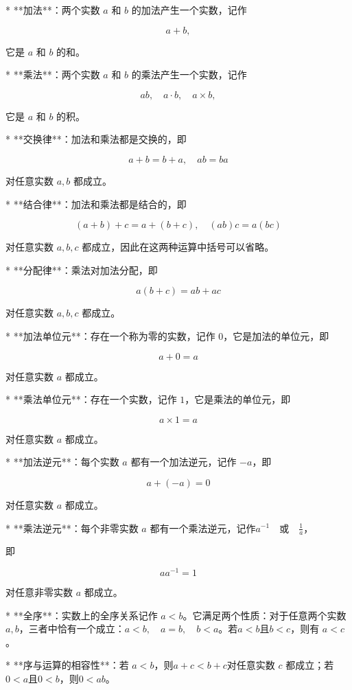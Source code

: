 * **加法**：两个实数 $a$ 和 $b$ 的加法产生一个实数，记作

  $$
  a+b,
  $$

  它是 $a$ 和 $b$ 的和。

* **乘法**：两个实数 $a$ 和 $b$ 的乘法产生一个实数，记作

  $$
  ab,\quad a\cdot b,\quad a\times b,
  $$

  它是 $a$ 和 $b$ 的积。

* **交换律**：加法和乘法都是交换的，即

  $$
  a+b=b+a,\quad ab=ba
  $$

  对任意实数 $a, b$ 都成立。

* **结合律**：加法和乘法都是结合的，即

  $$
  (a+b)+c=a+(b+c),\quad (ab)c=a(bc)
  $$

  对任意实数 $a, b, c$ 都成立，因此在这两种运算中括号可以省略。

* **分配律**：乘法对加法分配，即

  $$
  a(b+c)=ab+ac
  $$

  对任意实数 $a, b, c$ 都成立。

* **加法单位元**：存在一个称为零的实数，记作 $0$，它是加法的单位元，即

  $$
  a+0=a
  $$

  对任意实数 $a$ 都成立。

* **乘法单位元**：存在一个实数，记作 $1$，它是乘法的单位元，即

  $$
  a\times 1=a
  $$

  对任意实数 $a$ 都成立。

* **加法逆元**：每个实数 $a$ 都有一个加法逆元，记作 $-a$，即

  $$
  a+(-a)=0
  $$

  对任意实数 $a$ 都成立。

* **乘法逆元**：每个非零实数 $a$ 都有一个乘法逆元，记作$a^{-1}\quad \text{或}\quad \tfrac{1}{a}$，

  即

  $$
  aa^{-1}=1
  $$

  对任意非零实数 $a$ 都成立。

* **全序**：实数上的全序关系记作 $a<b$。它满足两个性质：对于任意两个实数 $a, b$，三者中恰有一个成立：$a<b,\quad a=b,\quad b<a$。若$a<b$且$b<c$，则有 $a<c$。

* **序与运算的相容性**：若 $a<b$，则$a+c<b+c$对任意实数 $c$ 都成立；若 $0<a$且$0<b$，则$0<ab$。
